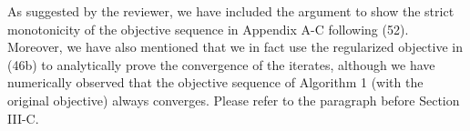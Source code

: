 \begin{enumerate}
  

\resp As suggested by the reviewer, we have included the argument to show the strict monotonicity of the objective sequence in Appendix A-C following (52). Moreover, we have also mentioned that we in fact use the regularized objective in (46b) to analytically prove the convergence of the iterates, although we have numerically observed that the objective sequence of Algorithm 1 (with the original objective) always converges. Please refer to the paragraph before Section III-C.

\begin{comment}
Note that the objective sequence \eqn{\{f(\mbf{x}_k)\}} generated by an iterative \ac{SCA} algorithm is monotonic, \textit{i.e}, \eqn{f(\mbf{x}_k) \leq f(\mbf{x}_{k-1})} and holds with equality at the limit point of the iterative procedure. However, upon convergence, due to the convexity of the objective, we may have multiple limit points, say, \eqn{\mbf{y}_{\ast}} with the same objective as \eqn{f(\mbf{y}_{\ast}) = f(\mbf{x}_{\ast})}. Therefore, strict monotonicity cannot be guaranteed for the objective sequence. However, when the objective function is strongly convex with a parameter \eqn{m > 0}, as discussed in Appendix A-B, the minimizer for the subproblem in each \ac{SCA} iteration \eqn{k} is unique as
\begin{equation} \label{eqn-aa}
f(\ma_{k}) - f(\ma_{k+1}) \geq  \nabla f(\ma_{k+1})^\tran (\ma_{k} - \ma_{k+1}) + m \|\ma_{k} - \ma_{k+1}\|^2
\end{equation}
where \eqn{\ma_{k+1}} is the optimal solution for the \eqn{\ith{k}} \ac{SCA} subproblem and \eqn{\ma_{k}} is the unique minimizer obtained in the previous \eqn{\ith{k-1}} \ac{SCA} step, which is a feasible point for the current problem. Since \eqn{\ma_{k+1}} is the solution in the \eqn{\ith{k}} \ac{SCA} problem, following conditions hold
\begin{subeqnarray}
\nabla f(\ma_{k+1})^\tran (\ma_{k} - \ma_{k+1}) &\geq& 0 \slabel{eqn-a} \\
f(\ma_{k}) - f(\ma_{k+1}) &\geq& m \|\ma_{k} - \ma_{k+1}\|^2 \slabel{eqn-b}
\end{subeqnarray}
where \eqref{eqn-a} is due to the lack of any descent direction in the feasible set and \eqref{eqn-b} follows from \eqref{eqn-aa} using \eqref{eqn-a}. As \eqn{k \rightarrow \infty, \|\ma_{k+1} - \ma_{k}\| \rightarrow 0}, and therefore the iterative algorithm converges to a unique minimizer, say, \eqn{\ma_{\ast}}, which is the limit point of the algorithm. Now by using the monotonicity of the \ac{SCA} updates and the uniqueness of the minimizer in each step, we can guarantee the strict monotonicity of the objective sequence generated by the iterative problem. 
\end{comment}


\end{enumerate}
